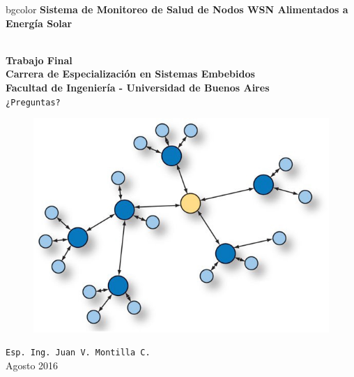 \documentclass[aspectratio=43, handout]{beamer}
\begin{document}
\begingroup
\makeatletter
\setlength{\hoffset}{-.5\beamer@sidebarwidth}
\makeatother
\begin{frame}
\begin{center}
\hfill
    \begin{beamercolorbox}[center,dp=3ex,ht=10.25ex, wd=1\linewidth]{bgcolor}
        \Large\textbf{Sistema de Monitoreo de Salud de Nodos WSN Alimentados a Energía Solar}\\
    \end{beamercolorbox}
\hfill\hfill
\\
\vspace{5px}
\textbf{Trabajo Final}\\
\textbf{Carrera de Especialización en Sistemas Embebidos}\\
\textbf{Facultad de Ingeniería - Universidad de Buenos Aires}\\
\vspace{10px}
\texttt{¿Preguntas?}\\

\vspace{10px}

\begin{figure}[H]
	\includegraphics[width=.3\textwidth]{./imagenes/red.jpg}
\end{figure}	
\vspace{10px}
\texttt{Esp. Ing. Juan V. Montilla C.}\\

\vspace{5px}
\tiny Agosto 2016 
 	  	
\end{center}
\end{frame}
\endgroup
\end{document}
